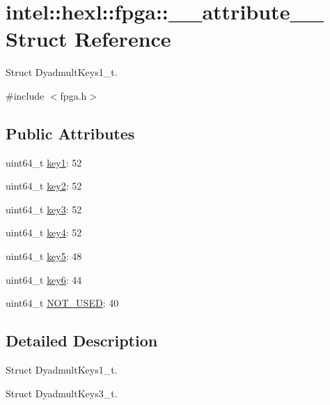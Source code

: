 \hypertarget{structintel_1_1hexl_1_1fpga_1_1____attribute____}{\section{intel\-:\-:hexl\-:\-:fpga\-:\-:\-\_\-\-\_\-attribute\-\_\-\-\_\- Struct Reference}
\label{structintel_1_1hexl_1_1fpga_1_1____attribute____}
}


Struct Dyadmult\-Keys1\-\_\-t.  




{\ttfamily \#include $<$fpga.\-h$>$}

\subsection*{Public Attributes}
\begin{DoxyCompactItemize}
\item 
uint64\-\_\-t \hyperlink{structintel_1_1hexl_1_1fpga_1_1____attribute_____a2162d44dea151a52db616ca95a56ef02}{key1}\-: 52
\item 
uint64\-\_\-t \hyperlink{structintel_1_1hexl_1_1fpga_1_1____attribute_____aeef311576d778306f27722e7643f3655}{key2}\-: 52
\item 
uint64\-\_\-t \hyperlink{structintel_1_1hexl_1_1fpga_1_1____attribute_____a492c7ef00c2f5ef3272490e020033201}{key3}\-: 52
\item 
uint64\-\_\-t \hyperlink{structintel_1_1hexl_1_1fpga_1_1____attribute_____a21a0d2969870a4181daa88a424b678b0}{key4}\-: 52
\item 
uint64\-\_\-t \hyperlink{structintel_1_1hexl_1_1fpga_1_1____attribute_____a0abbb812be3eb7211e64d306e732ac48}{key5}\-: 48
\item 
uint64\-\_\-t \hyperlink{structintel_1_1hexl_1_1fpga_1_1____attribute_____ac95e511d6edcb69c602566916413610c}{key6}\-: 44
\item 
uint64\-\_\-t \hyperlink{structintel_1_1hexl_1_1fpga_1_1____attribute_____a41031cd0840c7059646399a9452aaae2}{N\-O\-T\-\_\-\-U\-S\-E\-D}\-: 40
\end{DoxyCompactItemize}


\subsection{Detailed Description}
Struct Dyadmult\-Keys1\-\_\-t. 

Struct Dyadmult\-Keys3\-\_\-t.

